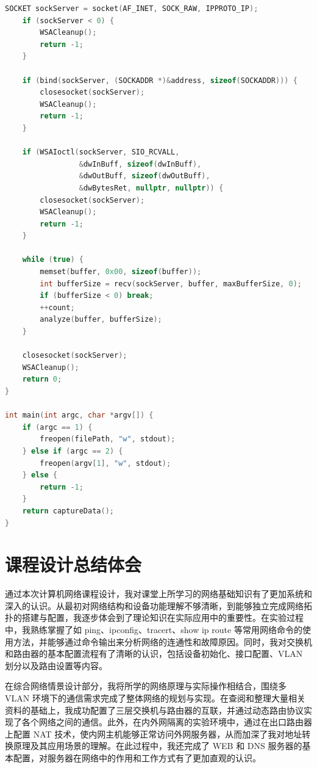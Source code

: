 \documentclass[UTF8,12pt,a4paper]{ctexart}
\begin{document}
\begin{lstlisting}[language=C++,caption={IP 数据包捕获与解析程序源码}]
    SOCKET sockServer = socket(AF_INET, SOCK_RAW, IPPROTO_IP);
    if (sockServer < 0) {
        WSACleanup();
        return -1;
    }

    if (bind(sockServer, (SOCKADDR *)&address, sizeof(SOCKADDR))) {
        closesocket(sockServer);
        WSACleanup();
        return -1;
    }

    if (WSAIoctl(sockServer, SIO_RCVALL,
                 &dwInBuff, sizeof(dwInBuff),
                 &dwOutBuff, sizeof(dwOutBuff),
                 &dwBytesRet, nullptr, nullptr)) {
        closesocket(sockServer);
        WSACleanup();
        return -1;
    }

    while (true) {
        memset(buffer, 0x00, sizeof(buffer));
        int bufferSize = recv(sockServer, buffer, maxBufferSize, 0);
        if (bufferSize < 0) break;
        ++count;
        analyze(buffer, bufferSize);
    }

    closesocket(sockServer);
    WSACleanup();
    return 0;
}

int main(int argc, char *argv[]) {
    if (argc == 1) {
        freopen(filePath, "w", stdout);
    } else if (argc == 2) {
        freopen(argv[1], "w", stdout);
    } else {
        return -1;
    }
    return captureData();
}
\end{lstlisting}



\newpage
\section{课程设计总结体会}

通过本次计算机网络课程设计，我对课堂上所学习的网络基础知识有了更加系统和深入的认识。从最初对网络结构和设备功能理解不够清晰，到能够独立完成网络拓扑的搭建与配置，我逐步体会到了理论知识在实际应用中的重要性。在实验过程中，我熟练掌握了如 ping、ipconfig、tracert、show ip route 等常用网络命令的使用方法，并能够通过命令输出来分析网络的连通性和故障原因。同时，我对交换机和路由器的基本配置流程有了清晰的认识，包括设备初始化、接口配置、VLAN 划分以及路由设置等内容。

在综合网络情景设计部分，我将所学的网络原理与实际操作相结合，围绕多 VLAN 环境下的通信需求完成了整体网络的规划与实现。在查阅和整理大量相关资料的基础上，我成功配置了三层交换机与路由器的互联，并通过动态路由协议实现了各个网络之间的通信。此外，在内外网隔离的实验环境中，通过在出口路由器上配置 NAT 技术，使内网主机能够正常访问外网服务器，从而加深了我对地址转换原理及其应用场景的理解。在此过程中，我还完成了 WEB 和 DNS 服务器的基本配置，对服务器在网络中的作用和工作方式有了更加直观的认识。
\end{document}
